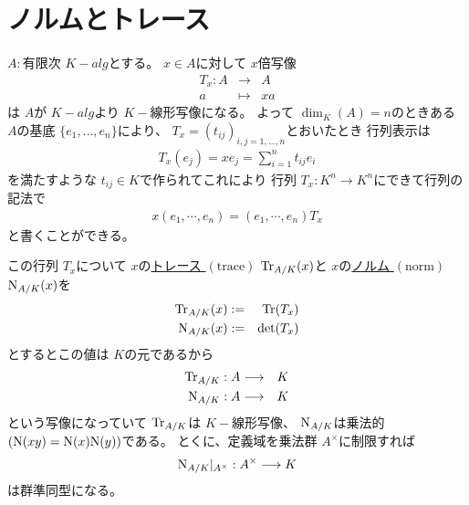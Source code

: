 \documentclass[../master_galois_theory]{subfiles}
\begin{document}
\setcounter{section}{9}

\section{ノルムとトレース}

\begin{defi}
  $A:$有限次 $K-alg$とする。
  $x \in A$に対して $x$倍写像
  \begin{eqnarray*}
    T_x : A & \longrightarrow & A \\
    a & \longmapsto & xa
  \end{eqnarray*}
  は $A$が $K-alg$より $K-$線形写像になる。
  よって $\dim_K(A) = n$のときある $A$の基底 $\{ e_1 , \dots , e_n \}$により、 $T_x = (t_{ij})_{i,j = 1 , \dots , n}$とおいたとき
  行列表示は
  \begin{eqnarray*}
    T_x (e_j) = x e_j = \sum_{i=1}^n t_{ij} e_i
  \end{eqnarray*}
  を満たすような $t_{ij} \in K$で作られてこれにより
  行列 $T_x : K^n \longrightarrow K^n$にできて行列の記法で
  \begin{eqnarray*}
    x(e_1 , \cdots , e_n) = (e_1 , \cdots , e_n) T_x
  \end{eqnarray*}
  と書くことができる。

  この行列 $T_x$について
  $x$の\underline{トレース $(\mathrm{trace})$} $\mathrm{Tr}_{A/K}(x)$と
  $x$の\underline{ノルム $(\mathrm{norm})$} $\mathrm{N}_{A/K}(x)$を
  \begin{eqnarray*}
    \mathrm{Tr}_{A/K}(x) & := & \mathrm{Tr}(T_x) \\
    \mathrm{N}_{A/K}(x) & := & \det(T_x)
  \end{eqnarray*}
  とするとこの値は $K$の元であるから
  \begin{eqnarray*}
    \mathrm{Tr}_{A/K} : A & \longrightarrow & K \\
    \mathrm{N}_{A/K} : A & \longrightarrow & K
  \end{eqnarray*}
  という写像になっていて
  $\mathrm{Tr}_{A/K}$は $K-$線形写像、 $\mathrm{N}_{A/K}$は乗法的 $(\mathrm{N}(xy) = \mathrm{N}(x) \mathrm{N}(y))$である。
  とくに、定義域を乗法群 $A^\times$に制限すれば
  \begin{eqnarray*}
    \mathrm{N}_{A/K}|_{A^\times} : A^\times \longrightarrow K
  \end{eqnarray*}
  は群準同型になる。
\end{defi}
\end{document}
